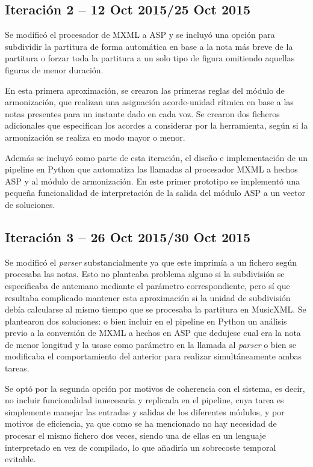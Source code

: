 \subsection{Iteración 2  -- 12 Oct 2015/25 Oct 2015}
\label{sec:second_iteration}
Se modificó el procesador de MXML a ASP y se incluyó una opción para subdividir la partitura de forma automática en base a la nota más breve de la partitura o forzar toda la partitura a un solo tipo de figura omitiendo aquellas figuras de menor duración.

En esta primera aproximación, se crearon las primeras reglas del módulo de armonización, que realizan una asignación acorde-unidad rítmica en base a las notas presentes para un instante dado en cada voz. Se crearon dos ficheros adicionales que especifican los acordes a considerar por la herramienta, según si la armonización se realiza en modo mayor o menor. 

Además se incluyó como parte de esta iteración, el diseño e implementación de un pipeline en Python que automatiza las llamadas al procesador MXML a hechos ASP y al módulo de armonización. En este primer prototipo se implementó una pequeña funcionalidad de interpretación de la salida del módulo ASP a un vector de soluciones.


\subsection{Iteración 3  -- 26 Oct 2015/30 Oct 2015}
\label{subsec:third_iteration}
Se modificó el \textit{parser} substancialmente ya que este imprimía a un fichero según procesaba las notas. Esto no planteaba problema alguno si la subdivisión se especificaba de antemano mediante el parámetro correspondiente, pero sí que resultaba complicado mantener esta aproximación si la unidad de subdivisión debía calcularse al mismo tiempo que se procesaba la partitura en MusicXML. Se plantearon dos soluciones: o bien incluir en el pipeline en Python un análisis previo a la conversión de MXML a hechos en ASP que dedujese cual era la nota de menor longitud y la usase como parámetro en la llamada al \textit{parser} o bien se modificaba el comportamiento del anterior para realizar simultáneamente ambas tareas. 

Se optó por la segunda opción por motivos de coherencia con el sistema, es decir, no incluir funcionalidad innecesaria y replicada en el pipeline, cuya tarea es simplemente manejar las entradas y salidas de los diferentes módulos, y por motivos de eficiencia, ya que como se ha mencionado no hay necesidad de procesar el mismo fichero dos veces, siendo una de ellas en un lenguaje interpretado en vez de compilado, lo que añadiría un sobrecoste temporal evitable.

